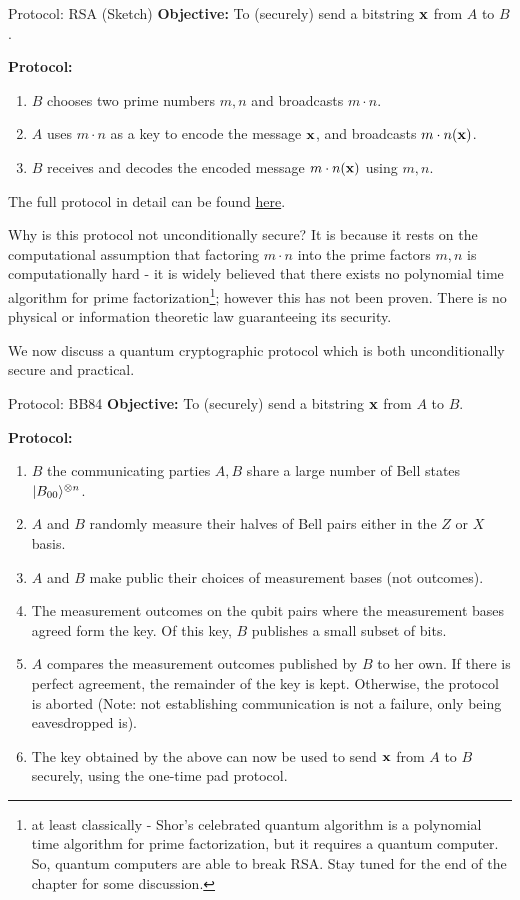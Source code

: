 \begin{blankbox}{Protocol: RSA (Sketch)}
    \textbf{Objective:} To (securely) send a bitstring $\mathbf{x}$ from $A$ to $B$.

    \noindent
    \textbf{Protocol:}
    \begin{enumerate}
        \item $B$ chooses two prime numbers $m, n$ and broadcasts $m \cdot n$.
        \item $A$ uses $m \cdot n$ as a key to encode the message $\mathbf{x}$, and broadcasts $m \cdot n(\mathbf{x})$. 
        \item $B$ receives and decodes the encoded message $m\cdot n(\mathbf{x})$ using $m, n$.
    \end{enumerate}

    The full protocol in detail can be found \href{https://en.wikipedia.org/wiki/RSA_(cryptosystem)}{here}.
\end{blankbox}
Why is this protocol not unconditionally secure? It is because it rests on the computational assumption that factoring $m \cdot n$ into the prime factors $m, n$ is computationally hard - it is widely believed that there exists no polynomial time algorithm for prime factorization\footnote{at least classically - Shor's celebrated quantum algorithm is a polynomial time algorithm for prime factorization, but it requires a quantum computer. So, quantum computers are able to break RSA. Stay tuned for the end of the chapter for some discussion.}; however this has not been proven. There is no physical or information theoretic law guaranteeing its security.

We now discuss a quantum cryptographic protocol which is both unconditionally secure and practical.

\begin{blankbox}{Protocol: BB84}
    \textbf{Objective:} To (securely) send a bitstring $\mathbf{x}$ from $A$ to $B$.

    \noindent
    \textbf{Protocol:}
    \begin{enumerate}
        \item $B$ the communicating parties $A, B$ share a large number of Bell states $\lvert B_{00} \rangle^{\otimes n}$.
        \item $A$ and $B$ randomly measure their halves of Bell pairs either in the $Z$ or $X$ basis.
        \item $A$ and $B$ make public their choices of measurement bases (not outcomes).
        \item The measurement outcomes on the qubit pairs where the measurement bases agreed form the key. Of this key, $B$ publishes a small subset of bits.
        \item $A$ compares the measurement outcomes published by $B$ to her own. If there is perfect agreement, the remainder of the key is kept. Otherwise, the protocol is aborted (Note: not establishing communication is not a failure, only being eavesdropped is).
        \item The key obtained by the above can now be used to send $\mathbf{x}$ from $A$ to $B$ securely, using the one-time pad protocol.
    \end{enumerate}
\end{blankbox}

